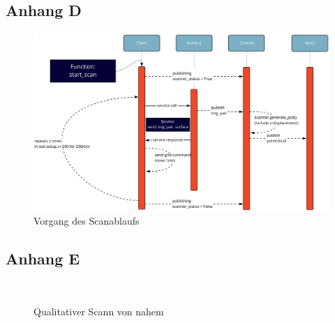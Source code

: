 \documentclass[	12pt,
				a4paper,
				bibliography=totoc,
				listof=totoc,
				index=totoc,
				twoside,
				headsepline,
				footsepline,
				ngerman]{scrartcl}
\begin{document}
\begin{appendix}
		\subsection{Anhang D}\label{anhang-d}
			\begin{figure}[h!]
				\centering
				\includegraphics[width=1\linewidth]{img/anhang/vorgang_scanablauf.jpg}
				\caption{Vorgang des Scanablaufs}
				\label{fig:vorgang_scan}
			\end{figure}
		\newpage
		\subsection{Anhang E}\label{anhang-e}
			\begin{figure}[h]
				\centering
				 \\
				\caption{Qualitativer Scann von nahem}
				\label{fig:scan_lines}
			\end{figure}
\end{appendix}
\cleardoublepage
\end{document}
